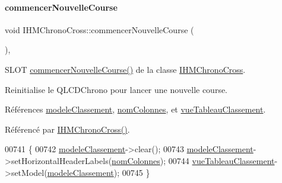 \mbox{\label{class_i_h_m_chrono_cross_ab899a1d60c1f853b199abb937ae08e74}} 
\paragraph{\texorpdfstring{commencer\+Nouvelle\+Course}{commencerNouvelleCourse}}
{\footnotesize\ttfamily void I\+H\+M\+Chrono\+Cross\+::commencer\+Nouvelle\+Course (\begin{DoxyParamCaption}{ }\end{DoxyParamCaption})\hspace{0.3cm}{\ttfamily [private]}, {\ttfamily [slot]}}



S\+L\+OT \hyperlink{class_i_h_m_chrono_cross_ab899a1d60c1f853b199abb937ae08e74}{commencer\+Nouvelle\+Course()} de la classe \hyperlink{class_i_h_m_chrono_cross}{I\+H\+M\+Chrono\+Cross}. 

Reinitialise le Q\+L\+C\+D\+Chrono pour lancer une nouvelle course. 

Références \hyperlink{class_i_h_m_chrono_cross_ac25c95280801f36c43a1c41cf2fa253e}{modele\+Classement}, \hyperlink{class_i_h_m_chrono_cross_a21f1b0ba82ff1b4a7b842b5f3c411e60}{nom\+Colonnes}, et \hyperlink{class_i_h_m_chrono_cross_a199204276756844adbd6ca3c9030ad2f}{vue\+Tableau\+Classement}.



Référencé par \hyperlink{class_i_h_m_chrono_cross_a479fc90733fba3e65fb06aa4a3adc02e}{I\+H\+M\+Chrono\+Cross()}.


\begin{DoxyCode}
00741 \{
00742     \hyperlink{class_i_h_m_chrono_cross_ac25c95280801f36c43a1c41cf2fa253e}{modeleClassement}->clear();
00743     \hyperlink{class_i_h_m_chrono_cross_ac25c95280801f36c43a1c41cf2fa253e}{modeleClassement}->setHorizontalHeaderLabels(\hyperlink{class_i_h_m_chrono_cross_a21f1b0ba82ff1b4a7b842b5f3c411e60}{nomColonnes});
00744     \hyperlink{class_i_h_m_chrono_cross_a199204276756844adbd6ca3c9030ad2f}{vueTableauClassement}->setModel(\hyperlink{class_i_h_m_chrono_cross_ac25c95280801f36c43a1c41cf2fa253e}{modeleClassement});
00745 \}
\end{DoxyCode}
\mbox{\label{class_i_h_m_chrono_cross_a3fc01e539c59645e0655e56e440f4b83}} 
